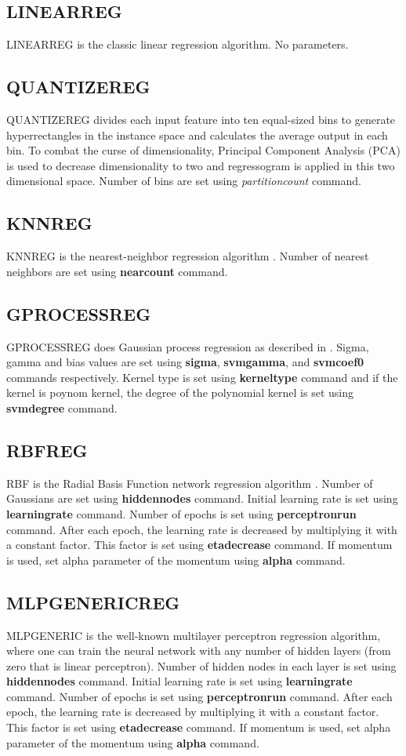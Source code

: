\documentclass[a4paper,12pt]{book}
\begin{document}
\subsection{LINEARREG}
LINEARREG is the classic linear regression algorithm. No parameters.

\subsection{QUANTIZEREG}
QUANTIZEREG divides each input feature into ten equal-sized bins to generate hyperrectangles in the instance space and calculates the average output in each bin. To combat the curse of dimensionality, Principal Component Analysis (PCA) is used to decrease dimensionality to two and regressogram is applied in this two dimensional space. Number of bins are set using {\em partitioncount} command.

\subsection{KNNREG}
KNNREG is the nearest-neighbor regression algorithm \cite{duda73}. Number of nearest neighbors are set using {\bf nearcount} command.

\subsection{GPROCESSREG}
GPROCESSREG does Gaussian process regression as described in \cite{bishop95}. Sigma, gamma and bias values are set using {\bf sigma}, {\bf svmgamma}, and {\bf svmcoef0} commands respectively. Kernel type is set using {\bf kerneltype} command and if the kernel is poynom kernel, the degree of the polynomial kernel is set using {\bf svmdegree} command.

\subsection{RBFREG}
RBF is the Radial Basis Function network regression algorithm \cite{alpaydin04}. Number of Gaussians are set using {\bf hiddennodes} command. Initial learning rate is set using {\bf learningrate} command. Number of epochs is set using {\bf perceptronrun} command. After each epoch, the learning rate is decreased by multiplying it with a constant factor. This factor is set using {\bf etadecrease} command. If momentum is used, set alpha parameter of the momentum using {\bf alpha} command.

\subsection{MLPGENERICREG}
MLPGENERIC is the well-known multilayer perceptron regression algorithm, where one can train the neural network with any number of hidden layers (from zero that is linear perceptron). Number of hidden nodes in each layer is set using {\bf hiddennodes} command. Initial learning rate is set using {\bf learningrate} command. Number of epochs is set using {\bf perceptronrun} command. After each epoch, the learning rate is decreased by multiplying it with a constant factor. This factor is set using {\bf etadecrease} command. If momentum is used, set alpha parameter of the momentum using {\bf alpha} command.
\end{document}
